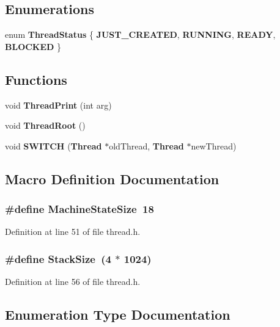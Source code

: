 \subsection*{Enumerations}
\begin{DoxyCompactItemize}
\item 
enum {\bf Thread\+Status} \{ {\bf J\+U\+S\+T\+\_\+\+C\+R\+E\+A\+T\+ED}, 
{\bf R\+U\+N\+N\+I\+NG}, 
{\bf R\+E\+A\+DY}, 
{\bf B\+L\+O\+C\+K\+ED}
 \}
\end{DoxyCompactItemize}
\subsection*{Functions}
\begin{DoxyCompactItemize}
\item 
void {\bf Thread\+Print} (int arg)
\item 
void {\bf Thread\+Root} ()
\item 
void {\bf S\+W\+I\+T\+CH} ({\bf Thread} $\ast$old\+Thread, {\bf Thread} $\ast$new\+Thread)
\end{DoxyCompactItemize}


\subsection{Macro Definition Documentation}
\subsubsection[{Machine\+State\+Size}]{\setlength{\rightskip}{0pt plus 5cm}\#define Machine\+State\+Size~18}\label{thread_8h_ac4750389bd2f44f1d404c25f8910e92b}


Definition at line 51 of file thread.\+h.

\subsubsection[{Stack\+Size}]{\setlength{\rightskip}{0pt plus 5cm}\#define Stack\+Size~(4 $\ast$ 1024)}\label{thread_8h_aa63b5617d3ddf26abb70f9b8d2b334f5}


Definition at line 56 of file thread.\+h.



\subsection{Enumeration Type Documentation}
